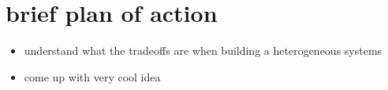 \section{brief plan of action}
\begin{itemize}
 \item understand what the tradeoffs are
when building a heterogeneous systems
 \item come up with very cool idea
\end{itemize}
\fontsize{8}{8.2}
\selectfont


\normalsize

